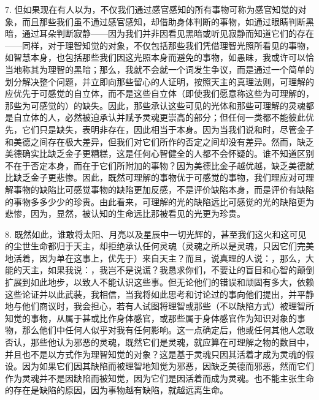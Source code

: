 7. 但如果现在有人以为，不仅我们通过感官感知的所有事物可称为感官知觉的对象，而且那些我们虽不通过感官感知，却借助身体判断的事物，如通过眼睛判断黑暗，通过耳朵判断寂静——因为我们并非因看见黑暗或听见寂静而知道它们的存在——同样，对于理智知觉的对象，不仅包括那些我们凭借理智光照所看见的事物，如智慧本身，也包括那些我们因这光照本身而避免的事物，如愚昧，我或许可以恰当地称其为理智的黑暗；那么，我就不会就一个词发生争议，而是通过一个简单的划分解决整个问题，并立即向那些留心的人证明，按照天主的真理法则，可理解的应优先于可感觉的自立体，而不是这些自立体（即使我们愿意称这些为可理解的，那些为可感觉的）的缺失。因此，那些承认这些可见的光体和那些可理解的灵魂都是自立体的人，必然被迫承认并赋予灵魂更崇高的部分；但任何一类都不能彼此优先，它们只是缺失，表明非存在，因此相当于本身。因为当我们说和时，尽管金子和美德之间存在极大差异，但我们对它们所作的否定之间却没有差异。然而，缺乏美德确实比缺乏金子更糟糕，这是任何心智健全的人都不会怀疑的。谁不知道区别不在于否定本身，而在于它们所附加的事物？因为美德比金子越优越，缺乏美德就比缺乏金子更悲惨。因此，既然可理解的事物优于可感觉的事物，我们理应对可理解事物的缺陷比可感觉事物的缺陷更加反感，不是评价缺陷本身，而是评价有缺陷的事物多多少少的珍贵。由此看来，可理解的光的缺陷远比可感觉的光的缺陷更为悲惨，因为，显然，被认知的生命远比那被看见的光更为珍贵。\par

8. 既然如此，谁敢将太阳、月亮以及星辰中一切光辉的，甚至我们这火和这可见的尘世生命都归于天主，却拒绝承认任何灵魂（灵魂之所以是灵魂，只因它们完美地活着，因为单在这事上，优先于）来自天主？而且，说真理的人说：，那么，大能的天主，如果我说：，我岂不是说谎？我恳求你们，不要让的盲目和心智的颠倒扩展到如此地步，以致人不能认识这些事。但无论他们的错误和顽固有多大，依赖这些论证并以此武装，我相信，当我将如此思考和讨论过的事向他们提出，并平静地与他们商议时，我会担心，若有人试图将理智或那些（不以缺陷方式）被理智所知觉的事物，从属于甚或比作身体感官，或那些属于身体感官作为知识对象的事物，那么他们中任何人似乎对我有任何影响。这一点确定后，他或任何其他人怎敢否认，那些他认为邪恶的灵魂，既然它们是灵魂，就应算在可理解之物的数目中，并且也不是以方式作为理智知觉的对象？这是基于灵魂只因其活着才成为灵魂的假设。因为如果它们因其缺陷而被理智地知觉为邪恶，因缺乏美德而邪恶，然而它们作为灵魂并不是因缺陷而被知觉，因为它们是因活着而成为灵魂。也不能主张生命的存在是缺陷的原因，因为事物越有缺陷，就越远离生命。\par

